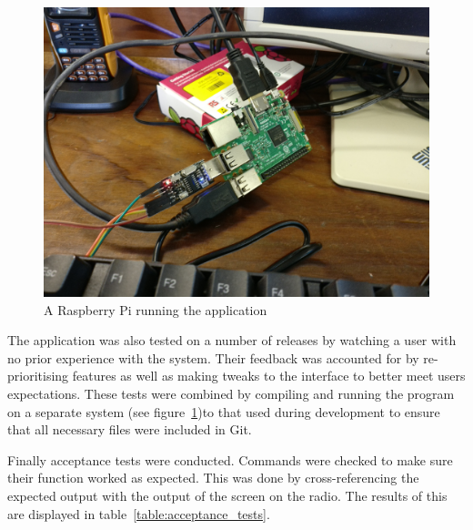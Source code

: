 \begin{figure}[]
    \centering
    \includegraphics[width=1\textwidth]{img/raspberry_pi.jpg}
    \caption{A Raspberry Pi running the application}
    \label{fig:raspberry_pi}
\end{figure}

The application was also tested on a number of releases by watching a user with no prior experience with the system. Their feedback was accounted for by re-prioritising features as well as making tweaks to the interface to better meet users expectations. These tests were combined by compiling and running the program on a separate system (see figure~\ref{fig:raspberry_pi})to that used during development to ensure that all necessary files were included in Git.

Finally acceptance tests were conducted. Commands were checked to make sure their function worked as expected. This was done by cross-referencing the expected output with the output of the screen on the radio. The results of this are displayed in table~\ref{table:acceptance_tests}.

